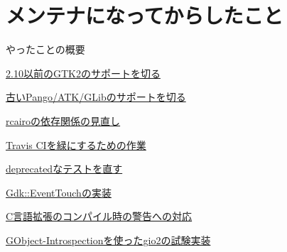 \section{メンテナになってからしたこと}

\begin{frame}
\begin{block}{やったことの概要}
\begin{itemize}
{\Large
\item
  \href{https://github.com/ruby-gnome2/ruby-gnome2/issues/182}{2.10以前のGTK2のサポートを切る }
\item
  \href{https://github.com/ruby-gnome2/ruby-gnome2/issues/190}{古いPango/ATK/GLibのサポートを切る }
\item
  \href{https://github.com/ruby-gnome2/ruby-gnome2/issues/193}{rcairoの依存関係の見直し }
\item
  \href{https://github.com/ruby-gnome2/ruby-gnome2/issues/200}{Travis CIを緑にするための作業 }
\item
  \href{https://github.com/ruby-gnome2/ruby-gnome2/issues/202}{deprecatedなテストを直す }
\item
  \href{https://github.com/ruby-gnome2/ruby-gnome2/issues/194}{Gdk::EventTouchの実装 }
\item
  \href{https://github.com/ruby-gnome2/ruby-gnome2/pull/205}{C言語拡張のコンパイル時の警告への対応 }
\item
  \href{https://github.com/ruby-gnome2/ruby-gnome2/commit/d2aea2aadfa60b2c586ea4d88f468a90dc2185bb}{GObject-Introspectionを使ったgio2の試験実装 }
}
\end{itemize}
\end{block}
\end{frame}
